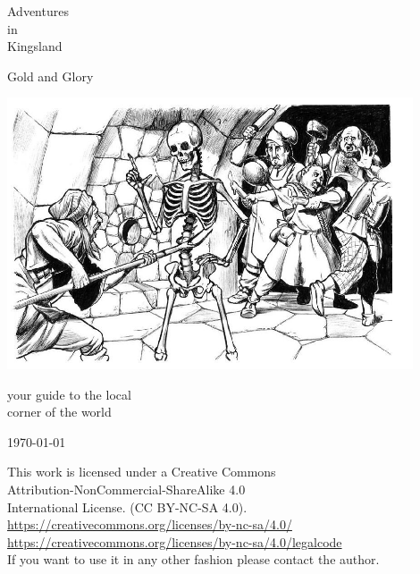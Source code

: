 \begin{center}

\huge         Adventures  \\
                  in      \\
              Kingsland

\vspace{0.3\baselineskip}

\large      Gold and Glory

\vspace{2cm}

\includegraphics[width=120mm]{./fig/skeleton.jpg}

\vspace{2 cm}


\normalsize
          your guide to the local    \\
            corner of the world

\vfill

\today

\end{center}






\clearpage
\thispagestyle{empty}
\raggedbottom

\vsmall
\noindent
This work is licensed under a Creative Commons \\
Attribution-NonCommercial-ShareAlike 4.0 \\
International License. (CC BY-NC-SA 4.0).\\
\url{https://creativecommons.org/licenses/by-nc-sa/4.0/} \\
\url{https://creativecommons.org/licenses/by-nc-sa/4.0/legalcode} \\
If you want to use it in any other fashion please contact the author.

